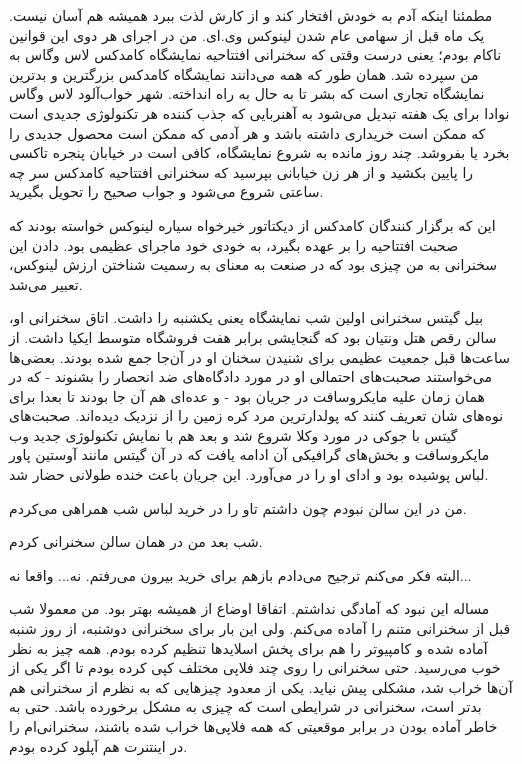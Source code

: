 مطمئنا اینکه آدم به خودش افتخار کند و از کارش لذت ببرد همیشه هم آسان
نیست. یک ماه قبل از سهامی عام شدن لینوکس وی.ای. من در اجرای هر دوی این
قوانین ناکام بودم؛ یعنی درست وقتی که سخنرانی افتتاحیه نمایشگاه
کامدکس لاس وگاس به من سپرده شد. همان طور که همه می‌دانند
نمایشگاه کامدکس بزرگترین و بدترین نمایشگاه تجاری است که بشر تا به حال
به راه انداخته. شهر خواب‌آلود لاس وگاس نوادا برای یک هفته تبدیل می‌شود
به آهنربایی که جذب کننده هر تکنولوژی جدیدی است که ممکن است خریداری
داشته باشد و هر آدمی که ممکن است محصول جدیدی را بخرد یا بفروشد. چند
روز مانده به شروع نمایشگاه، کافی است در خیابان پنجره تاکسی را پایین
بکشید و از هر زن خیابانی بپرسید که سخنرانی افتتاحیه کامدکس سر چه ساعتی
شروع می‌شود و جواب صحیح را تحویل بگیرید.

این که برگزار کنندگان کامدکس از دیکتاتور خیرخواه سیاره لینوکس خواسته
بودند که صحبت افتتاحیه را بر عهده بگیرد، به خودی خود ماجرای عظیمی
بود. دادن این سخنرانی به من چیزی بود که در صنعت به معنای به رسمیت
شناختن ارزش لینوکس، تعبیر می‌شد.

بیل گیتس سخنرانی اولین شب نمایشگاه یعنی یکشنبه را داشت. اتاق سخنرانی
او، سالن رقص هتل ونتیان بود که گنجایشی برابر
هفت فروشگاه متوسط ایکیا داشت. از ساعت‌ها قبل جمعیت عظیمی برای شنیدن سخنان او در
آن‌جا جمع شده بودند. بعضی‌ها می‌خواستند صحبت‌های احتمالی او در مورد
دادگاه‌های ضد انحصار را بشنوند - که در همان زمان علیه مایکروسافت در
جریان بود - و عده‌ای هم آن جا بودند تا بعدا برای نوه‌های شان تعریف کنند
که پولدارترین مرد کره زمین را از نزدیک دیده‌اند. صحبت‌های گیتس با جوکی
در مورد وکلا شروع شد و بعد هم با نمایش تکنولوژی‌ جدید وب مایکروسافت و
بخش‌های گرافیکی آن ادامه یافت که در آن گیتس مانند آوستین
پاور لباس پوشیده بود و
ادای او را در می‌آورد. این جریان باعث خنده طولانی حضار شد.

من در این سالن نبودم چون داشتم تاو را در خرید لباس شب همراهی می‌کردم. 

شب بعد من در همان سالن سخنرانی کردم. 

البته فکر می‌کنم ترجیح می‌دادم بازهم برای خرید بیرون می‌رفتم. نه... واقعا
نه...

مساله این نبود که آمادگی نداشتم. اتفاقا اوضاع از همیشه بهتر بود. من
معمولا شب قبل از سخنرانی متنم را آماده می‌کنم. ولی این بار برای سخنرانی
دوشنبه، از روز شنبه آماده شده و کامپیوتر را هم برای پخش اسلایدها تنظیم
کرده بودم. همه چیز به نظر خوب می‌رسید. حتی سخنرانی را روی چند فلاپی
مختلف کپی کرده بودم تا اگر یکی از آن‌ها خراب شد، مشکلی پیش نیاید. یکی
از معدود چیزهایی که به نظرم از سخنرانی‌ هم بدتر است، سخنرانی در شرایطی
است که چیزی به مشکل برخورده باشد. حتی به خاطر آماده بودن در برابر
موقعیتی که همه فلاپی‌ها خراب شده باشند، سخنرانی‌ام را در اینتنرت هم
آپلود کرده بودم.

